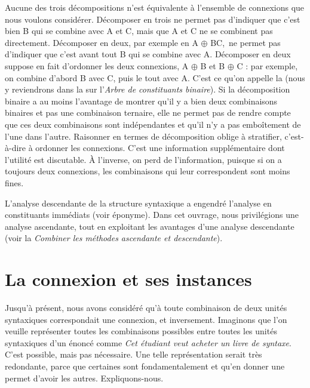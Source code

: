 Aucune des trois décompositions n’est équivalente à l’ensemble de connexions que nous voulons considérer. Décomposer en trois ne permet pas d’indiquer que c’est bien B qui se combine avec A et C, mais que A et C ne se combinent pas directement. Décomposer en deux, par exemple en A ${\oplus}$ BC,~ne permet pas d’indiquer que c’est avant tout B qui se combine avec A. Décomposer en deux suppose en fait d’ordonner les deux connexions, A ${\oplus}$ B et B ${\oplus}$ C : par exemple, on combine d’abord B avec C, puis le tout avec A. C’est ce qu’on appelle la  (nous y reviendrons dans la  sur l’\textit{Arbre de constituants binaire}). Si la décomposition binaire a au moins l’avantage de montrer qu’il y a bien deux combinaisons binaires et pas une combinaison ternaire, elle ne permet pas de rendre compte que ces deux combinaisons sont indépendantes et qu’il n’y a pas emboîtement de l’une dans l’autre. Raisonner en termes de décomposition oblige à stratifier, c’est-à-dire à ordonner les connexions. C’est une information supplémentaire dont l’utilité est discutable. À l’inverse, on perd de l’information, puisque si on a toujours deux connexions, les combinaisons qui leur correspondent sont moins fines.

\begin{sloppypar}
L’analyse descendante de la structure syntaxique a engendré l’analyse en constituants immédiats (voir  éponyme). Dans cet ouvrage, nous privilégions une analyse ascendante, tout en exploitant les avantages d’une analyse descendante (voir la  \textit{Combiner les méthodes ascendante et descendante}).
\end{sloppypar}

\section{La connexion et ses instances}\label{sec:3.2.14}

Jusqu’à présent, nous avons considéré qu’à toute combinaison de deux unités syntaxiques correspondait une connexion, et inversement. Imaginons que l’on veuille représenter toutes les combinaisons possibles entre toutes les unités syntaxiques d’un énoncé comme \textit{Cet étudiant veut acheter un livre de syntaxe}. C’est possible, mais pas nécessaire. Une telle représentation serait très redondante, parce que certaines  sont fondamentalement  et qu’en donner une permet d’avoir les autres. Expliquons-nous.

